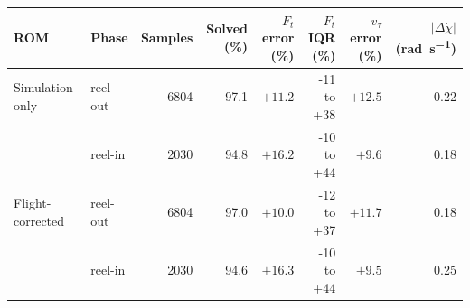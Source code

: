 \begin{tabular}{llrrrrrr}
\toprule
ROM & Phase & Samples & Solved (\%) & $F_t$ error (\%) & $F_t$ IQR (\%) & $v_\tau$ error (\%) & $|\Delta\dot\chi|$ (\si{\radian\per\second}) \\
\midrule
Simulation-only & reel-out & 6804 & 97.1 & $+11.2$ & -11 to +38 & $+12.5$ & 0.22 \\
 & reel-in & 2030 & 94.8 & $+16.2$ & -10 to +44 & $+9.6$ & 0.18 \\
Flight-corrected & reel-out & 6804 & 97.0 & $+10.0$ & -12 to +37 & $+11.7$ & 0.18 \\
 & reel-in & 2030 & 94.6 & $+16.3$ & -10 to +44 & $+9.5$ & 0.25 \\
\bottomrule
\end{tabular}
